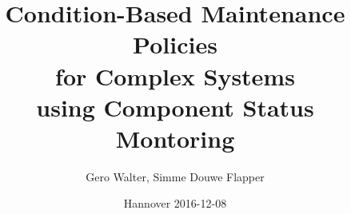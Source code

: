 \documentclass{beamer}
\begin{document}
\title{Condition-Based Maintenance Policies\\ for Complex Systems\\ using Component Status Montoring}

\author{Gero Walter, Simme Douwe Flapper}
\date{Hannover 2016-12-08}

\frame{
\titlepage
}

\end{document}
